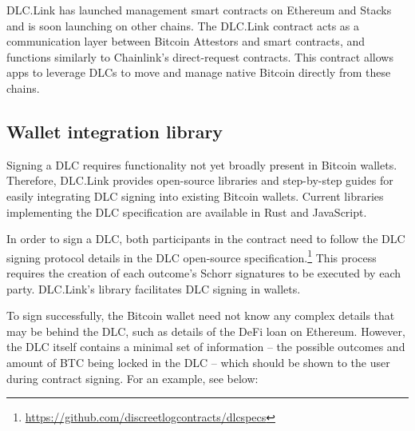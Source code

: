 \documentclass[twoside, a4paper, 11pt]{article}
\begin{document}
  DLC.Link has launched management smart contracts on Ethereum and Stacks and is soon launching on other chains. The DLC.Link contract acts as a communication layer between Bitcoin Attestors and smart contracts, and functions similarly to Chainlink’s direct-request contracts. This contract allows apps to leverage DLCs to move and manage native Bitcoin directly from these chains.

  \subsection{Wallet integration library}

  Signing a DLC requires functionality not yet broadly present in Bitcoin wallets. Therefore, DLC.Link provides open-source libraries and step-by-step guides for easily integrating DLC signing into existing Bitcoin wallets. Current libraries implementing the DLC specification are available in Rust and JavaScript.

  In order to sign a DLC, both participants in the contract need to follow the DLC signing protocol details in the DLC open-source specification.\footnote{\url{https://github.com/discreetlogcontracts/dlcspecs}} This process requires the creation of each outcome’s Schorr signatures to be executed by each party. DLC.Link’s library facilitates DLC signing in wallets.

  To sign successfully, the Bitcoin wallet need not know any complex details that may be behind the DLC, such as details of the DeFi loan on Ethereum. However, the DLC itself contains a minimal set of information – the possible outcomes and amount of BTC being locked in the DLC – which should be shown to the user during contract signing. For an example, see below:
\end{document}
